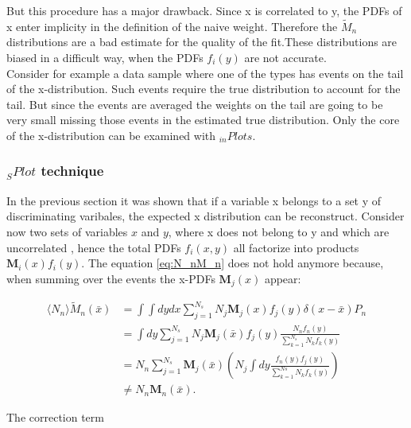 \documentclass[english]{uzhpub}
\begin{document}
 But this procedure has a major drawback. Since x is correlated to y, the PDFs of x enter implicity in the definition of the naive weight. Therefore the $\tilde{M}_n$ distributions are a bad estimate for the quality of the fit.These distributions are biased in a difficult way, when the PDFs $f_i(y)$ are not accurate. \\
 Consider for example a data sample where one of the types has events on the tail of the x-distribution. Such events require the true distribution to account for the tail. But since the events are averaged the weights on the tail are going to be very small missing those events in the estimated true distribution.
 Only the core of the x-distribution can be examined with $_{in} Plots$.


 \subsubsection{$_{S} Plot$ technique}
 In the previous section it was shown that if a variable x belongs to a set y of discriminating varibales, the expected x distribution can be reconstruct.
 Consider now two sets of variables $x$ and $y$, where x does not belong to y and which are uncorrelated , hence the total PDFs $f_i (x,y)$ all factorize into products $\textbf{M}_i (x) f_i(y)$.
 The equation \ref{eq:N_nM_n} does not hold anymore because, when summing over the events the x-PDFs $\textbf{M}_j(x)$ appear:

 \begin{align}
  \langle N_n \rangle \tilde{M}_n (\bar{x}) & = \int \int dy dx \sum_{j=1}^{N_s} N_j \textbf{M}_j (x) f_j (y) \delta (x- \bar{x}) P_n \label{eq:M_nX}                    \\
                                            & = \int dy \sum_{j=1}^{N_s} N_j \textbf{M}_j (\bar{x}) f_j(y) \frac{N_n f_n(y)}{\sum_{k=1}^{N_s} N_k f_k(y)}                \\
                                            & = N_n \sum_{j=1}^{N_s} \textbf{M}_j (\bar{x}) \left( N_j \int dy \frac{f_n(y) f_j(y)}{\sum_{k=1}^{Ns} N_k f_k (y)} \right) \\
                                            & \neq N_n \textbf{M}_n (\bar{x}).
 \end{align}

 The correction term
\end{document}
